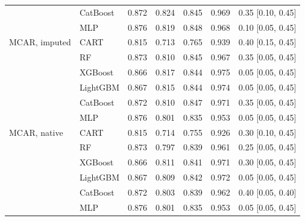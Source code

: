 \begin{table}[p]
\begin{tabular}{@{}llrrrrl@{}}
 & CatBoost & 0.872 & 0.824 & 0.845 & 0.969 & 0.35 [0.10, 0.45] \\
 & MLP & 0.876 & 0.819 & 0.848 & 0.968 & 0.10 [0.05, 0.45] \\
\midrule
MCAR, imputed & CART & 0.815 & 0.713 & 0.765 & 0.939 & 0.40 [0.15, 0.45] \\
 & RF & 0.873 & 0.810 & 0.845 & 0.967 & 0.35 [0.05, 0.45] \\
 & XGBoost & 0.866 & 0.817 & 0.844 & 0.975 & 0.05 [0.05, 0.45] \\
 & LightGBM & 0.867 & 0.815 & 0.844 & 0.974 & 0.05 [0.05, 0.45] \\
 & CatBoost & 0.872 & 0.810 & 0.847 & 0.971 & 0.35 [0.05, 0.45] \\
 & MLP & 0.876 & 0.801 & 0.835 & 0.953 & 0.05 [0.05, 0.45] \\
\midrule
MCAR, native & CART & 0.815 & 0.714 & 0.755 & 0.926 & 0.30 [0.10, 0.45] \\
 & RF & 0.873 & 0.797 & 0.839 & 0.961 & 0.25 [0.05, 0.45] \\
 & XGBoost & 0.866 & 0.811 & 0.841 & 0.971 & 0.30 [0.05, 0.45] \\
 & LightGBM & 0.867 & 0.809 & 0.842 & 0.972 & 0.05 [0.05, 0.45] \\
 & CatBoost & 0.872 & 0.803 & 0.839 & 0.962 & 0.40 [0.05, 0.40] \\
 & MLP & 0.876 & 0.801 & 0.835 & 0.953 & 0.05 [0.05, 0.45] \\
\bottomrule
\end{tabular}
\end{table}

